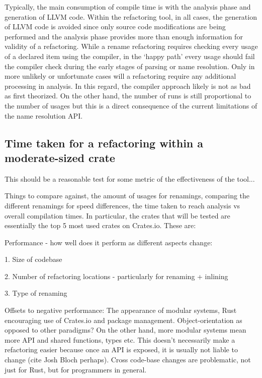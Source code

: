 Typically, the main consumption of compile time is with the analysis phase and generation of LLVM code. Within the refactoring tool, in all cases, the generation of LLVM code is avoided since only source code modifications are being performed and the analysis phase provides more than enough information for validity of a refactoring. While a rename refactoring requires checking every usage of a declared item using the compiler, in the `happy path' every usage should fail the compiler check during the early stages of parsing or name resolution. Only in more unlikely or unfortunate cases will a refactoring require any additional processing in analysis. In this regard, the compiler approach likely is not as bad as first theorized. On the other hand, the number of runs is still proportional to the number of usages but this is a direct consequence of the current limitations of the name resolution API.

\subsection{Time taken for a refactoring within a moderate-sized crate}
This should be a reasonable test for some metric of the effectiveness of the tool...

Things to compare against, the amount of usages for renamings, comparing the different renamings for speed differences, the time taken to reach analysis vs overall compilation times. 
In particular, the crates that will be tested are essentially the top 5 most used crates on Crates.io. These are: 

Performance - how well does it perform as different aspects change:

1. Size of codebase

2. Number of refactoring locations - particularly for renaming + inlining

3. Type of renaming

Offsets to negative performance:
The appearance of modular systems, Rust encouraging use of Crates.io and package management. Object-orientation as opposed to other paradigms? On the other hand, more modular systems mean more API and shared functions, types etc. This doesn't necessarily make a refactoring easier because once an API is exposed, it is usually not liable to change (cite Josh Bloch perhaps). Cross code-base changes are problematic, not just for Rust, but for programmers in general.

